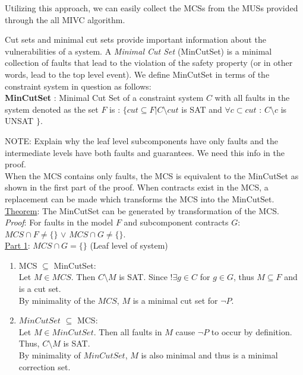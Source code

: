 Utilizing this approach, we can easily collect the MCSs from the MUSs provided through the all MIVC algorithm. 

Cut sets and minimal cut sets provide important information about the vulnerabilities of a system. A \textit{Minimal Cut Set} (MinCutSet) is a minimal collection of faults that lead to the violation of the safety property (or in other words, lead to the top level event). We define MinCutSet in terms of the constraint system in question as follows:\\

\textbf{MinCutSet} : Minimal Cut Set of a constraint system $C$ with all faults in the system denoted as the set $F$ is : $\{ cut \subseteq F | C \setminus cut$ is SAT and $\forall c \subset cut$ : $C \setminus c$ is UNSAT $\}$. 


NOTE: Explain why the leaf level subcomponents have only faults and the intermediate levels have both faults and guarantees. We need this info in the proof. \\

When the MCS contains only faults, the MCS is equivalent to the MinCutSet as shown in the first part of the proof. When contracts exist in the MCS, a replacement can be made which transforms the MCS into the MinCutSet. \\

\underline{Theorem}: The MinCutSet can be generated by transformation of the MCS.\\


\textit{Proof}: For faults in the model $F$ and subcomponent contracts $G$:\\ $MCS \cap F \neq \{\}$ $\lor$ $MCS \cap G \neq \{\}$.\\

\underline{Part 1}: $MCS \cap G = \{\}$ (Leaf level of system)\\
\begin{enumerate}[label=(\roman*)]

\item MCS $\subseteq$ MinCutSet: \\

Let $M \in  MCS$. Then $C\setminus M$ is SAT. Since $!\exists g \in C$ for $g \in G$, thus $M \subseteq F$ and is a cut set.  \\

By minimality of the $MCS$, $M$ is a minimal cut set for $ \neg P $.  \\

\item $MinCutSet $ $\subseteq$ MCS: \\

Let $M \in MinCutSet$. Then all faults in $M$ cause $ \neg P $ to occur by definition. Thus, $C\setminus M$ is SAT.  \\

By minimality of $MinCutSet$, $M$ is also minimal and thus is a minimal correction set.\\

\end{enumerate}

